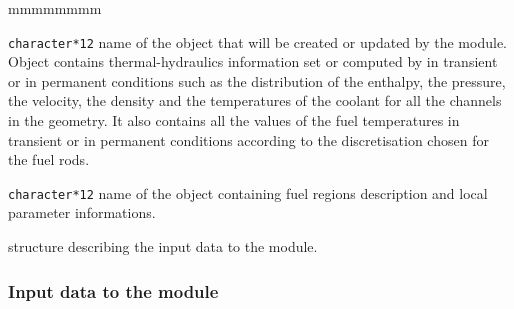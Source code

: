 \begin{ListeDeDescription}{mmmmmmmm}

\item[\dusa{THERMO}] \texttt{character*12} name of the 
object that will be created or updated by the  module. Object 
contains thermal-hydraulics information set or computed by  in transient or in
permanent conditions such as the distribution of the enthalpy, the pressure, the velocity,
the density and the temperatures of the coolant for all the channels in the geometry. It also contains all the values of the fuel temperatures in transient or in permanent conditions according to the discretisation chosen for the fuel rods.

\item[\dusa{MAPFL}] \texttt{character*12} name of the  
object containing fuel regions description and local parameter informations.

\item[\dstr{descthm}] structure describing the input data to the  module. 

\end{ListeDeDescription}

\vskip 0.2cm

\subsubsection{Input data to the  module}\label{sect:thmstr}

